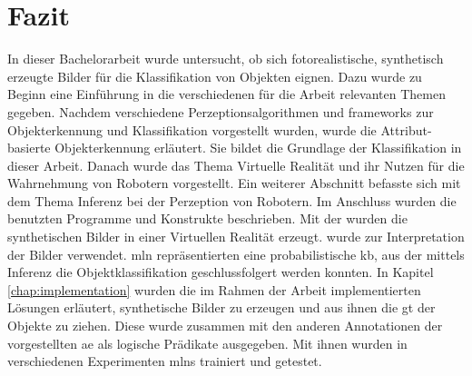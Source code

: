 \graphicspath{{./images/}}      
\def\CHAPTERONE{./chapters/Chapter-1} 

\chapter{Fazit}
\label{chap:fazit}
%	

In dieser Bachelorarbeit wurde untersucht, ob sich fotorealistische, synthetisch erzeugte Bilder für die Klassifikation von Objekten eignen. Dazu wurde zu Beginn eine Einführung in die verschiedenen für die Arbeit relevanten Themen gegeben. Nachdem verschiedene Perzeptionsalgorithmen und \glspl{framework} zur Objekterkennung und Klassifikation vorgestellt wurden, wurde die Attribut-basierte Objekterkennung erläutert. Sie bildet die Grundlage der Klassifikation in dieser Arbeit. Danach wurde das Thema Virtuelle Realität und ihr Nutzen für die Wahrnehmung von Robotern vorgestellt. Ein weiterer Abschnitt befasste sich mit dem Thema Inferenz bei der Perzeption von Robotern. Im Anschluss wurden die benutzten Programme und Konstrukte beschrieben. Mit der \unreal wurden die synthetischen Bilder in einer Virtuellen Realität erzeugt. \robosherlock wurde zur Interpretation der Bilder verwendet. \gls{mln} repräsentierten eine probabilistische \gls{kb}, aus der mittels Inferenz die Objektklassifikation geschlussfolgert werden konnten. In Kapitel \ref{chap:implementation} wurden die im Rahmen der Arbeit implementierten Lösungen erläutert, synthetische Bilder zu erzeugen und aus ihnen die \gls{gt} der Objekte zu ziehen. Diese wurde zusammen mit den anderen Annotationen der vorgestellten \gls{ae} als logische Prädikate ausgegeben. Mit ihnen wurden in verschiedenen Experimenten \glspl{mln} trainiert und getestet. \par

